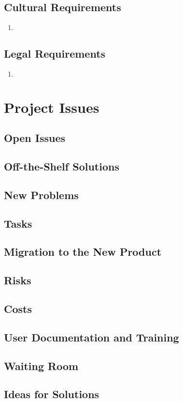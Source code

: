 \documentclass{article}
\begin{document}
\subsection{Cultural Requirements}
\begin{enumerate}
\item
\end{enumerate}
\subsection{Legal Requirements}
\begin{enumerate}
\item
\end{enumerate}

\section{Project Issues}

\subsection{Open Issues }
\subsection{Off-the-Shelf Solutions}
\subsection{New Problems}
\subsection{Tasks}
\subsection{Migration to the New Product}
\subsection{Risks}
\subsection{Costs}
\subsection{User Documentation and Training}
\subsection{Waiting Room}
\subsection{Ideas for Solutions}
\end{document}
